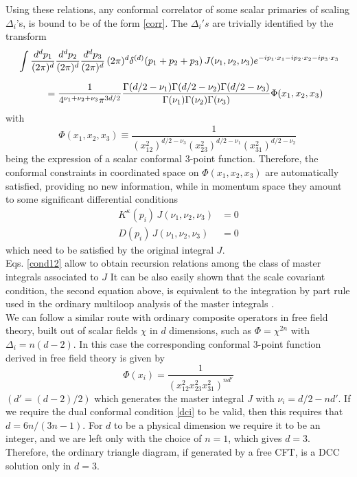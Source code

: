 \documentclass[a4paper,11pt,openright,twoside]{book}
\numberwithin{equation}{section}
\begin{document}
{Using these relations, any conformal correlator of some scalar primaries of scaling $\Delta_i$'s, is 
bound to be of the form \eqref{corr}. The $\Delta_i's$  are trivially identified by the transform
\begin{align}
	& \int \frac{d^d p_1}{(2\pi)^d} \frac{d^d p_2}{(2\pi)^d} \frac{d^d p_3}{(2\pi)^d} \, (2\pi)^d \delta^{(d)}(p_1 + p_2 + p_3) \, 
	J(\nu_1,\nu_2,\nu_3) e^{- i p_1 \cdot x_1 - i p_2 \cdot x_2 - i p_3 \cdot x_3} \notag\\[1.5ex]
	&\hspace{1cm} = \frac{1}{4^{\nu_1+\nu_2+\nu_3} \pi^{3 d/2}}  \frac{\Gamma(d/2 - \nu_1) \Gamma(d/2 - \nu_2) \Gamma(d/2 - \nu_3)}{\Gamma(\nu_1) 
		\Gamma(\nu_2) \Gamma(\nu_3)} \Phi(x_1,x_2,x_3)  
	\label{oner}
\end{align}
with 
\begin{equation}
	\Phi(x_1,x_2,x_3)\equiv \frac{1}{(x_{12}^2)^{d/2- \nu_3} (x_{23}^2)^{d/2- \nu_1} (x_{31}^2)^{d/2- \nu_2}}\,
\end{equation}
being the expression of a scalar conformal 3-point function.
Therefore, the conformal constraints in coordinated space on $\Phi(x_1,x_2,x_3)$ are automatically satisfied, providing no new information, while in momentum space they amount to some significant differential conditions
\begin{equation}
	\label{cond12}
	\begin{split}
		K^\kappa(p_i)\,J(\nu_1,\nu_2,\nu_3) &=0 \\
		D(p_i)\,J(\nu_1,\nu_2,\nu_3)&=0
	\end{split}
\end{equation}
which need to be satisfied by the original integral $J$.\\
Eqs. \eqref{cond12} allow to obtain recursion relations among the class of master integrals associated to $J$  It can be also easily shown that the scale covariant condition, the second equation above, is equivalent to the integration by part rule used in the ordinary multiloop analysis of the master integrals \cite{Coriano:2013jba}.\\
We can follow a similar route with ordinary composite operators in free field theory, built out of scalar fields $\chi$ in $d$ dimensions, such as $\Phi=\chi^{2 n}$ with $\Delta_i=n(d-2)$. In this case the corresponding conformal 3-point function derived in free field theory is given by 
\begin{equation}
	\Phi(x_i)=\frac{1}{\left(x_{12}^2 x_{23}^2 x_{31}^2\right)^{n d'}}
\end{equation}
$(d'=(d-2)/2)$ which generates the master integral $J$ with $\nu_i=d/2 -nd'$. If we require the dual conformal condition 
\eqref{dci} to be valid, then this requires that $d= 6n/(3 n -1)$. For $d$ to be a physical dimension we require it to be an integer, and we are left only with the choice of $n=1$, which gives $d=3$. Therefore, the ordinary triangle diagram, if generated by a free CFT, is a DCC solution only in $d=3$.

}
\end{document}
